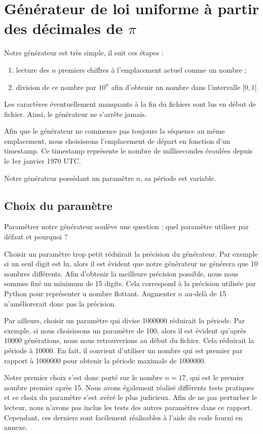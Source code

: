 \documentclass[10pt,a4paper]{article}
\begin{document}
	\section{Générateur de loi uniforme à partir des décimales de $\pi$}
	Notre générateur est très simple, il suit ces étapes :
	\begin{enumerate}
		\item lecture des $n$ premiers chiffres à l'emplacement actuel comme un nombre ;
		\item division de ce nombre par $10^{n}$ afin d'obtenir un nombre dans l'intervalle $[0, 1[$.
	\end{enumerate}
	Les caractères éventuellement manquants à la fin du fichiers sont lus en début de fichier. Ainsi, le générateur ne s'arrête jamais.
	
	Afin que le générateur ne commence pas toujours la séquence au même emplacement, nous choisissons l'emplacement de départ en fonction d'un timestamp.
	Ce timestamp représente le nombre de millisecondes écoulées depuis le 1er janvier 1970 UTC.
	
	Notre générateur possédant un paramètre $n$, sa période est variable.
	
	\subsection{Choix du paramètre}
	Paramétrer notre générateur soulève une question : quel paramètre utiliser par défaut et pourquoi ?
	
	Choisir un paramètre trop petit réduirait la précision du générateur.
	Par exemple si un seul digit est lu, alors il est évident que notre générateur ne générera que 10 nombres différents.
	Afin d'obtenir la meilleure précision possible, nous nous sommes fixé un minimum de 15 digits.
	Cela correspond à la précision utilisée par Python pour représenter u nombre flottant.
	Augmenter $n$ au-delà de 15 n'améliorerait donc pas la précision.
	
	Par ailleurs, choisir un paramètre qui divise 1000000 réduirait la période.
	Par exemple, si nous choisissons un paramètre de 100, alors il est évident qu'après 10000 générations, nous nous retrouverions au début du fichier.
	Cela réduirait la période à 10000.
	En fait, il convient d'utiliser un nombre qui est premier par rapport à 1000000 pour obtenir la période maximale de 1000000.
	
	Notre premier choix s'est donc porté sur le nombre $n = 17$, qui est le premier nombre premier après 15.
	Nous avons également réalisé différents tests pratiques et ce choix du paramètre s'est avéré le plus judicieux.
	Afin de ne pas perturber le lecteur, nous n'avons pas inclus les tests des autres paramètres dans ce rapport.
	Cependant, ces derniers sont facilement réalisables à l'aide du code fourni en annexe.
	
\end{document}
